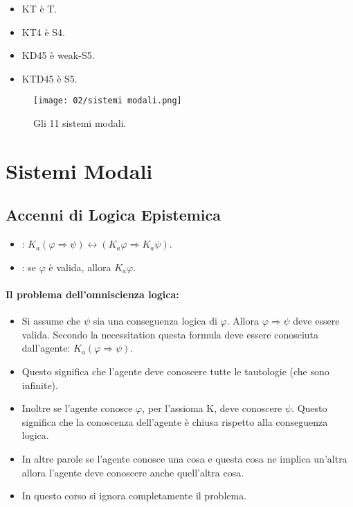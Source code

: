 \begin{itemize}
  \item KT è T. 
  \item KT4 è S4. 
  \item KD45 è weak-S5.
  \item KTD45 è S5.
\end{itemize}

\begin{figure}[!h]
    \centering
    \texttt{[image: 02/sistemi modali.png]}
    \caption{Gli 11 sistemi modali.}
\end{figure}

\section{Sistemi Modali}

\subsection{Accenni di Logica Epistemica}


\begin{itemize}
  \item {}: $K_a(\varphi\Rightarrow\psi) \leftrightarrow (K_a\varphi\Rightarrow K_a\psi)$.
  \item {}: se $\varphi$ è valida, allora $K_a\varphi$.
 
\end{itemize}

\paragraph{Il problema dell'omniscienza logica:}

\begin{itemize}
   \item Si assume che $\psi$ sia una conseguenza logica di $\varphi$. Allora $\varphi \Rightarrow \psi$ deve essere valida. Secondo la necessitation questa formula deve essere conosciuta dall'agente: $K_a(\varphi \Rightarrow \psi)$.
  \item Questo significa che l'agente deve conoscere tutte le tautologie (che sono infinite). 
  \item Inoltre se l'agente conosce $\varphi$, per l'assioma K, deve conoscere $\psi$. Questo significa che la conoscenza dell'agente è chiusa rispetto alla conseguenza logica.
  \item In altre parole se l'agente conosce una cosa e questa cosa ne implica un'altra allora l'agente deve conoscere anche quell'altra cosa.
  \item In questo corso si ignora completamente il problema.
\end{itemize}

